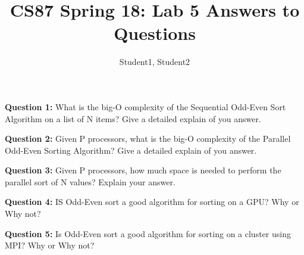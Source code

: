 \documentclass[11pt]{article}
\begin{document}
\title{CS87 Spring 18:  Lab 5 Answers to Questions}

\author{Student1, Student2 }

\maketitle

{\bf Question 1:} What is the big-O complexity of the Sequential Odd-Even Sort
Algorithm on a list of N items?  Give a detailed explain of you answer.


\vspace{0.5cm}

{\bf Question 2:} Given P processors, what is the big-O complexity of the
Parallel Odd-Even Sorting Algorithm?  Give a detailed explain of you answer.


\vspace{0.5cm}

{\bf Question 3:} Given P processors, how much space is needed to perform the
parallel sort of N values? Explain your answer.

\vspace{0.5cm}

{\bf Question 4:} IS Odd-Even sort a good algorithm for sorting on a GPU? Why or
Why not?

\vspace{0.5cm}

{\bf Question 5:} Is Odd-Even sort a good algorithm for sorting on a cluster
using MPI? Why or Why not?




\end{document}
